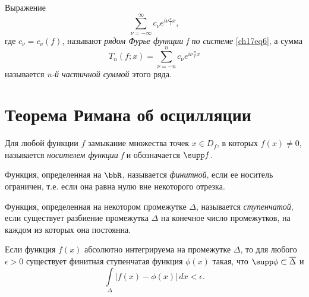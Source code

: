 \begin{defn}
Выражение
$$
\sum_{\nu = -\infty}^{\infty} c_{\nu}e^{i\nu\frac{\pi}{l}x},
$$
где $c_{\nu} = c_{\nu}(f)$, называют \textit{рядом Фурье функции f по системе} \eqref{ch17eq6}, а сумма
$$
T_{n}(f;x) = \sum_{\nu = -n}^{n} c_{\nu}e^{i\nu\frac{\pi}{l}x}
$$
называется \textit{n-й частичной суммой} этого ряда.
\end{defn}

\section{Теорема Римана об осцилляции}
\begin{defn}
Для любой функции $f$ замыкание множества точек $x \in D_{f}$, в которых $f(x) \neq 0$, называется \textit{носителем функции f} и обозначается $\supp f$.
\end{defn}
\begin{defn}
Функция, определенная на $\bbR$, называется \textit{финитной}, если ее носитель ограничен, т.е. если она равна нулю вне некоторого отрезка.
\end{defn}
\begin{defn}
Функция, определенная на некотором промежутке $\Delta$, называется \textit{ступенчатой}, если существует разбиение промежутка $\Delta$ на конечное число промежутков, на каждом из которых она постоянна.
\end{defn}
\begin{thm} \label{ch17thm1}
Если функция $f(x)$ абсолютно интегрируема на промежутке $\Delta$, то для любого $\epsilon > 0$ существует финитная ступенчатая функция $\phi(x)$ такая, что $\supp\phi \subset \overline{\Delta}$ и
\begin{equation} \label{ch17eq7}
\int\limits_{\Delta} |f(x) - \phi(x)|\,dx < \epsilon.
\end{equation}
\end{thm}
